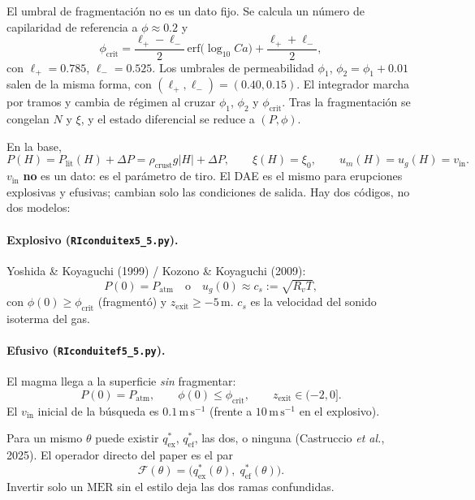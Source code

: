 \documentclass[11pt,a4paper]{article}
\newcommand{\MER}{\mathrm{MER}}
\newcommand{\Rv}{R_v}
\begin{document}
El umbral de fragmentación no es un dato fijo. Se calcula un número
de capilaridad de referencia a $\phi\approx0.2$ y
\begin{equation}
\label{eq:phicrit}
\phi_{\mathrm{crit}}
=\frac{\ell_+-\ell_-}{2}\,\mathrm{erf}\bigl(\log_{10}Ca\bigr)
+\frac{\ell_++\ell_-}{2},
\end{equation}
con $\ell_+=0.785$, $\ell_-=0.525$. Los umbrales de permeabilidad
$\phi_1$, $\phi_2=\phi_1+0.01$ salen de la misma forma, con
$(\ell_+,\ell_-)=(0.40,0.15)$. El integrador marcha por tramos y
cambia de régimen al cruzar $\phi_1$, $\phi_2$ y
$\phi_{\mathrm{crit}}$. Tras la fragmentación se congelan $N$ y $\xi$,
y el estado diferencial se reduce a $(P,\phi)$.

En la base,
\begin{equation}
\label{eq:bc-base}
P(H)=P_{\mathrm{lit}}(H)+\Delta P
=\rho_{\mathrm{crust}}g|H|+\Delta P,
\qquad
\xi(H)=\xi_0,
\qquad
u_m(H)=u_g(H)=v_{\mathrm{in}}.
\end{equation}
$v_{\mathrm{in}}$ \textbf{no} es un dato: es el parámetro de tiro. El
DAE es el mismo para erupciones explosivas y efusivas; cambian solo
las condiciones de salida. Hay dos códigos, no dos modelos:

\paragraph{Explosivo (\texttt{RIconduitex5\_5.py}).}
Yoshida \& Koyaguchi (1999) / Kozono \& Koyaguchi (2009):
\begin{equation}
\label{eq:bc-top}
P(0)=P_{\mathrm{atm}}
\quad\text{o}\quad
u_g(0)\approx c_s:=\sqrt{\Rv T},
\end{equation}
con $\phi(0)\ge\phi_{\mathrm{crit}}$ (fragmentó) y
$z_{\mathrm{exit}}\ge-5\,\mathrm{m}$. $c_s$ es la velocidad del
sonido isoterma del gas.

\paragraph{Efusivo (\texttt{RIconduitef5\_5.py}).}
El magma llega a la superficie \emph{sin} fragmentar:
\begin{equation}
\label{eq:bc-ef}
P(0)=P_{\mathrm{atm}},
\qquad
\phi(0)\le\phi_{\mathrm{crit}},
\qquad
z_{\mathrm{exit}}\in(-2,0].
\end{equation}
El $v_{\mathrm{in}}$ inicial de la búsqueda es $0.1\,\mathrm{m\,s^{-1}}$
(frente a $10\,\mathrm{m\,s^{-1}}$ en el explosivo).

Para un mismo $\theta$ puede existir $q_{\mathrm{ex}}^\ast$,
$q_{\mathrm{ef}}^\ast$, las dos, o ninguna
(Castruccio \emph{et al.}, 2025). El operador directo del paper es el
par
\begin{equation}
\label{eq:F}
\mathcal{F}(\theta)
=\bigl(q_{\mathrm{ex}}^\ast(\theta),\;q_{\mathrm{ef}}^\ast(\theta)\bigr).
\end{equation}
Invertir solo un $\MER$ sin el estilo deja las dos ramas confundidas.
\end{document}
